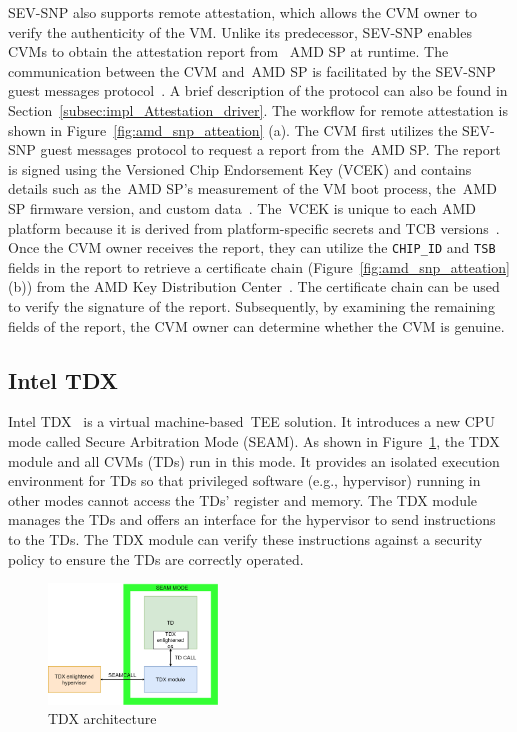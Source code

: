 SEV-SNP also supports remote attestation, which allows the \acrshort{CVM} owner to verify the authenticity of the VM. Unlike its predecessor, SEV-SNP enables \acrshort{CVM}s to obtain the attestation report from ~\acrshort{AMD SP} at runtime. The communication between the \acrshort{CVM} and~\acrshort{AMD SP} 
is facilitated by the SEV-SNP guest messages protocol~\cite*{snp_firmware, amd_sev_summarize}. A brief description of the protocol can also be found in Section~\ref{subsec:impl_Attestation_driver}.  The workflow for remote attestation is shown in Figure~\ref{fig:amd_snp_atteation} (a). 
The \acrshort{CVM} first utilizes the SEV-SNP guest messages protocol to request a report from the~\acrshort{AMD SP}. The report is signed using the Versioned Chip Endorsement Key (VCEK) and contains details such as the~\acrshort{AMD SP}'s measurement of the VM boot process, the~\acrshort{AMD SP} 
firmware version, and custom data~\cite*{snp_firmware}. The~\acrshort{VCEK} is unique to each AMD platform because it is derived from platform-specific secrets and TCB versions~\cite*{snp_firmware}. Once the \acrshort{CVM} owner receives the report,  they can utilize the \texttt{CHIP\_ID} and \texttt{TSB} fields in the report to 
retrieve a certificate chain (Figure~\ref{fig:amd_snp_atteation} (b)) from the AMD Key Distribution Center~\cite*{amd_sev_summarize}. The certificate chain can be used to verify the signature of the report. Subsequently, by examining the remaining fields of the report, the \acrshort{CVM} owner 
can determine whether the \acrshort{CVM} is genuine.

\subsection{Intel TDX}
\label{subsec:tdx}

Intel TDX~\cite*{Intel_tdx_whitepaper} is a virtual machine-based~\acrshort{TEE} solution. It introduces a new CPU mode called Secure Arbitration Mode (SEAM). As shown in Figure~\ref{fig:td_arch}, the TDX module and all \acrshort{CVM}s (TDs) run in this mode. It provides an 
isolated execution environment for TDs so that privileged software (e.g., hypervisor) running in other modes cannot access the TDs' register and memory. The TDX module manages the TDs and offers an interface for the hypervisor to send instructions to the TDs. The TDX module can verify these instructions against a security policy to ensure the TDs are correctly operated.

\begin{figure}[htp]
  \centering
  \includegraphics[width=0.4\textwidth]{images/td_arch.png}
  \caption[TDX architecture]{TDX architecture}
  \label{fig:td_arch}
\end{figure}


